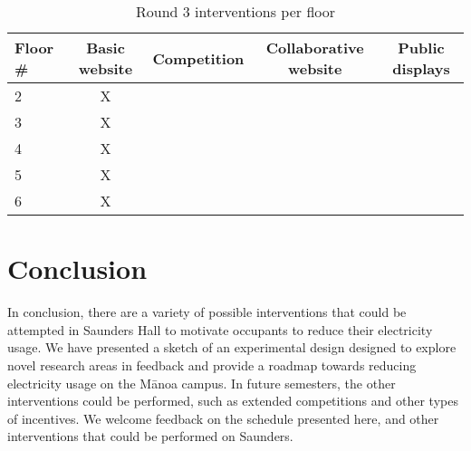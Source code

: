 \documentclass[11pt]{article}
\begin{document}
\begin{table}[htbp]
	\centering
		\begin{tabular}{| l || c | c | c | c |}
			\hline
			Floor \# & Basic website & Competition & Collaborative website & Public displays \tabularnewline \hline \hline
			
			2 & X &   &   & \tabularnewline \hline
			
			3 & X &   &  & \tabularnewline \hline

			4 & X &   &   &   \tabularnewline \hline

			5 & X &   &  &   \tabularnewline \hline
			
			6 & X &   &   &   \tabularnewline \hline
		\end{tabular}
	\caption{Round 3 interventions per floor}
	\label{tab:post-competition-per-floor}
\end{table}

\section{Conclusion}

In conclusion, there are a variety of possible interventions that could be attempted in Saunders Hall to motivate occupants to reduce their electricity usage. We have presented a sketch of an experimental design designed to explore novel research areas in feedback and provide a roadmap towards reducing electricity usage on the M\=anoa campus. In future semesters, the other interventions could be performed, such as extended competitions and other types of incentives. We welcome feedback on the schedule presented here, and other interventions that could be performed on Saunders.





%
%
\end{document}
